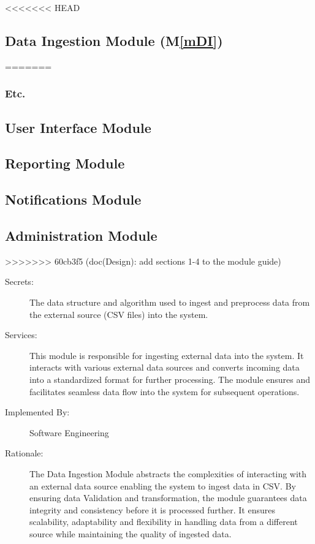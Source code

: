 \documentclass[12pt, titlepage]{article}
\newcommand{\mref}[1]{M\ref{#1}}
\begin{document}
\begin{description}
<<<<<<< HEAD
\subsection{Data Ingestion Module (\mref{mDI})} \label{mIngestion}
=======
\subsubsection{Etc.}

\subsection{User Interface Module}

\subsection{Reporting Module}

\subsection{Notifications Module}

\subsection{Administration Module}

>>>>>>> 60cb3f5 (doc(Design): add sections 1-4 to the module guide)
\begin{description}
  \item[Secrets:] The data structure and algorithm used to ingest and preprocess data from
  the external source (CSV files) into the system.
  \item[Services:] This module is responsible for ingesting external data into the system.
  It interacts with various external data sources and converts incoming data into a 
  standardized format for further processing. The module ensures and facilitates seamless
  data flow into the system for subsequent operations.
  \item[Implemented By:] Software Engineering
  \item[Rationale:] The Data Ingestion Module abstracts the complexities of interacting with
  an external data source enabling the system to ingest data in CSV. By ensuring data Validation
  and transformation, the module guarantees data integrity and consistency before it is processed
  further. It ensures scalability, adaptability and flexibility in handling data from a different
  source while maintaining the quality of ingested data.
\end{description}


\end{description}
\end{document}
